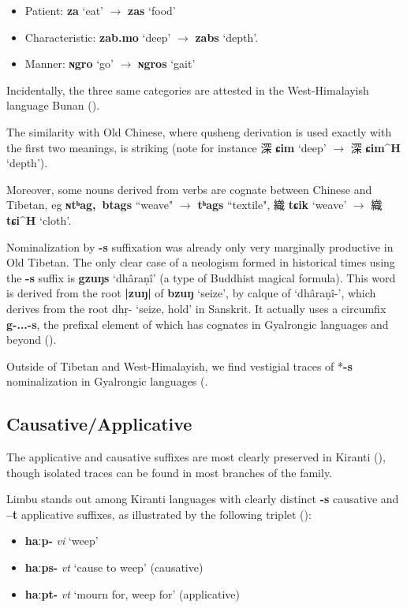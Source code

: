 \documentclass[oneside,a4paper,11pt]{article}
\newcommand{\ipa}[1]{{\phon\textbf{\mbox{#1}}}}
\newcommand{\zh}[1]{{\cn#1}}
\newcommand{\ch}[3]{\zh{#1} \ipa{#2} `#3'}
\begin{document}
\begin{itemize}
\item Patient: \ipa{za} `eat' $\rightarrow$ \ipa{zas} `food' 
\item Characteristic: \ipa{zab.mo} `deep'  $\rightarrow$ \ipa{zabs} `depth'.
\item Manner: \ipa{ɴgro} `go'  $\rightarrow$ \ipa{ɴgros} `gait' 
 \end{itemize}
 
Incidentally, the three same categories are attested in the West-Himalayish language Bunan (\citealt[179-180]{widmer14bunan}).

The similarity with Old Chinese, where qusheng derivation is used exactly with the first two meanings, is striking (note for instance \ch{深}{ɕim}{deep} $\rightarrow$ \ch{深}{ɕim^H}{depth}).

Moreover, some nouns derived from verbs are cognate between Chinese and Tibetan, eg \ipa{ɴtʰag, btags} ``weave" $\rightarrow$ \ipa{tʰags} ``textile", \ch{織}{tɕik}{weave} $\rightarrow$ \ch{織}{tɕi^H}{cloth}.

Nominalization by \ipa{-s} suffixation was already only very marginally productive in Old Tibetan. The only clear case of a neologism formed in historical times using the \ipa{-s} suffix is \ipa{gzuŋs} `dhâraṇî' (a type of Buddhist magical formula). This word is derived from the root \ipa{|zuŋ|} of \ipa{bzuŋ} `seize', by calque of `dhâraṇî-', which derives from the root dhṛ- `seize, hold' in Sanskrit. It actually uses a circumfix \ipa{g-...-s}, the prefixal element of which has cognates in Gyalrongic languages and beyond (\citealt{konnerth16gV, jacques14snom}).

Outside of Tibetan and West-Himalayish, we find vestigial traces of *\ipa{-s} nominalization in Gyalrongic languages (\citealt{jacques03s.houzhui, jackson14morpho}.

 \subsection{Causative/Applicative} \label{sec:causative}
The applicative and causative suffixes are most clearly preserved in Kiranti (\citealt{michailovsky85dental, jacques15derivational.khaling}), though isolated traces can be found in most branches of the family.

Limbu stands out among Kiranti languages with clearly distinct \ipa{-s} causative and \ipa{--t} applicative suffixes, as illustrated by the following triplet (\citealt{michailovsky02dico}):
\begin{itemize}
\item \ipa{haːp-} \textit{vi} `weep'
\item \ipa{haːps-} \textit{vt} `cause to weep' (causative)
\item \ipa{haːpt-} \textit{vt} `mourn for, weep for' (applicative)
\end{itemize}
\end{document}
